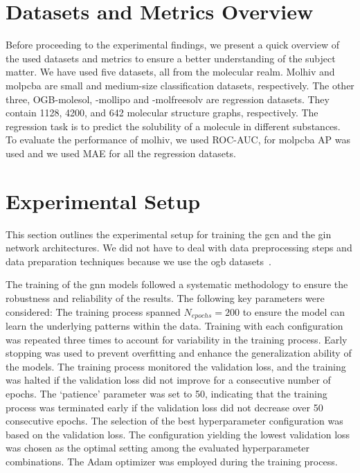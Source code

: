 \section{Datasets and Metrics Overview}
\label{sec:eval:overvies}

Before proceeding to the experimental findings, we present a quick overview of the used datasets and metrics to ensure a better understanding of the subject matter. We have used five datasets, all from the molecular realm. Molhiv and molpcba are small and medium-size classification datasets, respectively.
The other three, OGB-molesol, -mollipo and -molfreesolv are regression datasets. They contain 1128, 4200, and 642
molecular structure graphs, respectively. The regression task is to predict the solubility
of a molecule in different substances.
To evaluate the performance of molhiv, we used ROC-AUC, for molpcba AP was used and we used MAE for all the regression datasets.

\section{Experimental Setup}
\label{sec:eval:setup}
This section outlines the experimental setup for training the \ac{gcn} and the \ac{gin} network architectures.
We did not have to deal with data preprocessing steps and data preparation techniques because we use the \ac{ogb} datasets~\cite{Hu2020}.

The training of the \ac{gnn} models followed a systematic methodology to ensure the robustness and reliability of the results. The following key parameters were considered:
The training process spanned  $N_{epochs}= 200$ to ensure the model can learn the underlying patterns within the data.
Training with each configuration was repeated three times to account for variability in the training process.
Early stopping was used to prevent overfitting and enhance the generalization ability of the models. The training process monitored the validation loss, and the training was halted if the validation loss did not improve for a consecutive number of epochs.
The `patience' parameter was set to 50, indicating that the training process was terminated early if the validation loss did not decrease over 50 consecutive epochs.
The selection of the best hyperparameter configuration was based on the validation loss.
The configuration yielding the lowest validation loss was chosen as the optimal setting among the evaluated hyperparameter combinations.
The Adam optimizer was employed during the training process.

